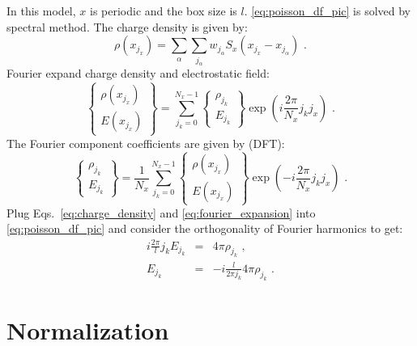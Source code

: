 \documentclass[12pt]{article}
\let\orgautoref\autoref
\renewcommand{\autoref}[1]
{%
    \def\equationautorefname{Eq.}%
    \def\figureautorefname{Fig.}%
    \def\subfigureautorefname{Fig.}%
    \def\sectionautorefname{Sec.}%
    \def\subsubsectionautorefname{Sec.}%
    \orgautoref{#1}%
}
\begin{document}
In this model, $x$ is periodic and the box size is $l$.
\autoref{eq:poisson_df_pic} is solved by spectral method.
The charge density is given by:
\begin{equation}
	\rho(x_{j_x}) = \sum_\alpha \sum_{j_\alpha} w_{j_\alpha} S_x(x_{j_x} - x_{j_\alpha}) \textrm{ .} \label{eq:charge_density}
\end{equation}
Fourier expand charge density and electrostatic field:
\begin{equation}
	\left\{ \begin{array}{c}
		\rho(x_{j_x}) \\
		E(x_{j_x})
	\end{array} \right\} = \sum_{j_k = 0}^{N_x - 1} \left\{ \begin{array}{c}
		\rho_{j_k} \\
		E_{j_k}
	\end{array} \right\} \exp \left( i \frac{2 \pi}{N_x} j_k j_x \right) \textrm{ .} \label{eq:fourier_expansion}
\end{equation}
The Fourier component coefficients are given by (DFT):
\begin{equation}
	\left\{ \begin{array}{c}
		\rho_{j_k} \\
		E_{j_k}
	\end{array} \right\} = \frac{1}{N_x} \sum_{j_k = 0}^{N_x - 1} \left\{ \begin{array}{c}
		\rho(x_{j_x}) \\
		E(x_{j_x})
	\end{array} \right\} \exp \left( -i \frac{2 \pi}{N_x} j_k j_x \right) \textrm{ .} \label{eq:dft}
\end{equation}
Plug Eqs.~\ref{eq:charge_density} and \ref{eq:fourier_expansion} into \autoref{eq:poisson_df_pic} and consider the orthogonality of Fourier harmonics to get:
\begin{eqnarray}
	i \frac{2 \pi}{l} j_k E_{j_k} & = & 4 \pi \rho_{j_k} \textrm{ ,} \label{eq:poisson_df_pic_fourier1} \\
	E_{j_k} & = & -i \frac{l}{2 \pi j_k} 4 \pi \rho_{j_k} \textrm{ .} \label{eq:poisson_df_pic_fourier2}
\end{eqnarray}


\section{Normalization}
\end{document}
